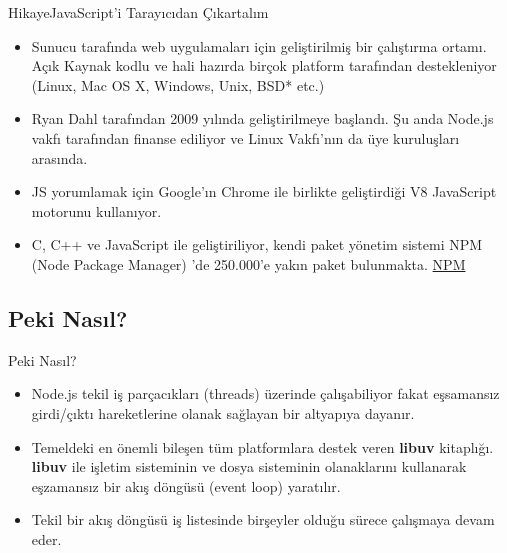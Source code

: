 \documentclass[xcolor=dvipsnames]{beamer}
\begin{document}
\begin{frame}{Hikaye}{JavaScript'i Tarayıcıdan Çıkartalım}
\begin{itemize}
    \item {
        Sunucu tarafında web uygulamaları için geliştirilmiş bir
        çalıştırma ortamı. Açık Kaynak kodlu ve hali hazırda birçok
        platform tarafından destekleniyor (Linux, Mac OS X, Windows, Unix, BSD* etc.)
        \pause
    }
    \item {
        Ryan Dahl tarafından 2009 yılında geliştirilmeye başlandı.
        Şu anda Node.js vakfı tarafından finanse ediliyor ve Linux Vakfı'nın da
        üye kuruluşları arasında.
        \pause
    }
    \item {
        JS yorumlamak için Google'ın Chrome ile birlikte geliştirdiği V8
        JavaScript motorunu kullanıyor.
        \pause
    }
    \item {
        C, C++ ve JavaScript ile geliştiriliyor, kendi paket yönetim sistemi NPM
        (Node Package Manager) 'de 250.000'e yakın paket bulunmakta.
        \href{https://npmjs.com}{NPM}
    }
\end{itemize}
\end{frame}

\begin{frame}
    \centering{}
\end{frame}

\subsection{Peki Nasıl?}

\begin{frame}{Peki Nasıl?}
\begin{itemize}
    \item {
        Node.js tekil iş parçacıkları (threads) üzerinde çalışabiliyor fakat
        eşsamansız girdi/çıktı hareketlerine olanak sağlayan bir altyapıya dayanır.
        \pause
    }
    \item {
        Temeldeki en önemli bileşen tüm platformlara destek veren \textbf{libuv} kitaplığı.
        \textbf{libuv} ile işletim sisteminin ve dosya sisteminin olanaklarını
        kullanarak eşzamansız bir akış döngüsü (event loop) yaratılır.
        \pause
    }
    \item {
        Tekil bir akış döngüsü iş listesinde birşeyler olduğu sürece çalışmaya devam eder.
        \pause
    }
\end{itemize}
\end{frame}
\end{document}
